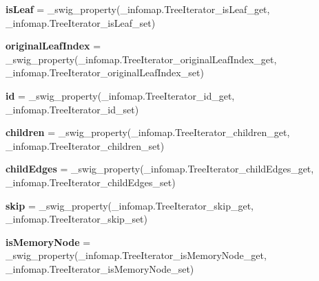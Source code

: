 \begin{DoxyCompactItemize}
{\bfseries is\+Leaf} = \+\_\+swig\+\_\+property(\+\_\+infomap.\+Tree\+Iterator\+\_\+is\+Leaf\+\_\+get, \+\_\+infomap.\+Tree\+Iterator\+\_\+is\+Leaf\+\_\+set)
\item 
\mbox{\label{classdsmacc_1_1graph_1_1infomap_1_1TreeIterator_a77d24ee5a8923b78be03a0511f379723}} 
{\bfseries original\+Leaf\+Index} = \+\_\+swig\+\_\+property(\+\_\+infomap.\+Tree\+Iterator\+\_\+original\+Leaf\+Index\+\_\+get, \+\_\+infomap.\+Tree\+Iterator\+\_\+original\+Leaf\+Index\+\_\+set)
\item 
\mbox{\label{classdsmacc_1_1graph_1_1infomap_1_1TreeIterator_a56c3a716840bf23eaadd68f23af84ce7}} 
{\bfseries id} = \+\_\+swig\+\_\+property(\+\_\+infomap.\+Tree\+Iterator\+\_\+id\+\_\+get, \+\_\+infomap.\+Tree\+Iterator\+\_\+id\+\_\+set)
\item 
\mbox{\label{classdsmacc_1_1graph_1_1infomap_1_1TreeIterator_a0a78acd4af421811585403443fada1de}} 
{\bfseries children} = \+\_\+swig\+\_\+property(\+\_\+infomap.\+Tree\+Iterator\+\_\+children\+\_\+get, \+\_\+infomap.\+Tree\+Iterator\+\_\+children\+\_\+set)
\item 
\mbox{\label{classdsmacc_1_1graph_1_1infomap_1_1TreeIterator_adbfa21fb388cd7c83e258fe364dff86d}} 
{\bfseries child\+Edges} = \+\_\+swig\+\_\+property(\+\_\+infomap.\+Tree\+Iterator\+\_\+child\+Edges\+\_\+get, \+\_\+infomap.\+Tree\+Iterator\+\_\+child\+Edges\+\_\+set)
\item 
\mbox{\label{classdsmacc_1_1graph_1_1infomap_1_1TreeIterator_a4ed1e9557a6a707c1c3ee81cdff7464b}} 
{\bfseries skip} = \+\_\+swig\+\_\+property(\+\_\+infomap.\+Tree\+Iterator\+\_\+skip\+\_\+get, \+\_\+infomap.\+Tree\+Iterator\+\_\+skip\+\_\+set)
\item 
\mbox{\label{classdsmacc_1_1graph_1_1infomap_1_1TreeIterator_a38d0047ad2ae59d81ef20141de3cb73d}} 
{\bfseries is\+Memory\+Node} = \+\_\+swig\+\_\+property(\+\_\+infomap.\+Tree\+Iterator\+\_\+is\+Memory\+Node\+\_\+get, \+\_\+infomap.\+Tree\+Iterator\+\_\+is\+Memory\+Node\+\_\+set)
\item 

\end{DoxyCompactItemize}
